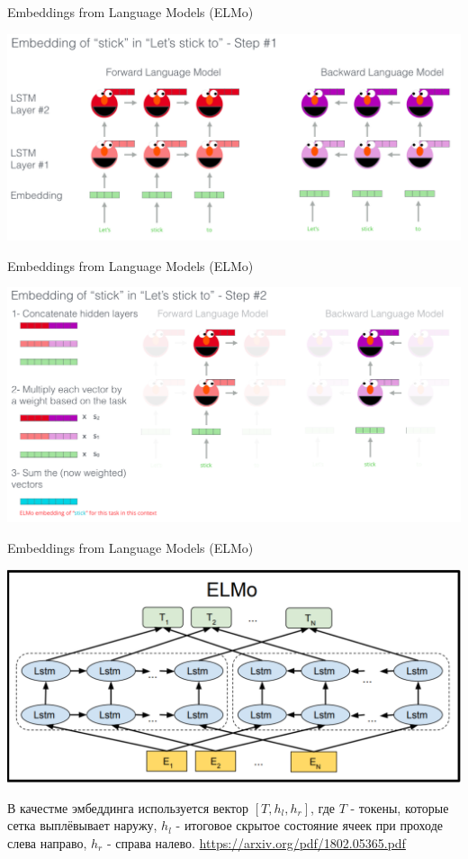\documentclass[notes,12pt, aspectratio=169]{beamer}
\begin{document}
\begin{frame}{ Embeddings from Language Models (ELMo)}
	\begin{center}
		\includegraphics[width=.9\linewidth]{elmo3.png}
	\end{center}
\end{frame}

\begin{frame}{ Embeddings from Language Models (ELMo)}
	\begin{center}
		\includegraphics[width=.9\linewidth]{elmo4.png}
	\end{center}
\end{frame}



\begin{frame}{ Embeddings from Language Models (ELMo)}
	\begin{center}
		\includegraphics[width=.6\linewidth]{ elmo.png}
	\end{center}
	В качестме эмбеддинга используется вектор $[𝑇 , h_𝑙, h_𝑟]$, где $𝑇$ - токены, которые сетка выплёвывает наружу, $h_𝑙$ - итоговое скрытое состояние ячеек при проходе слева направо, $h_𝑟$ - справа налево.
	\vfill
	\footnotesize
	{\color{blue} \url{https://arxiv.org/pdf/1802.05365.pdf}  } 
\end{frame}
\end{document}
